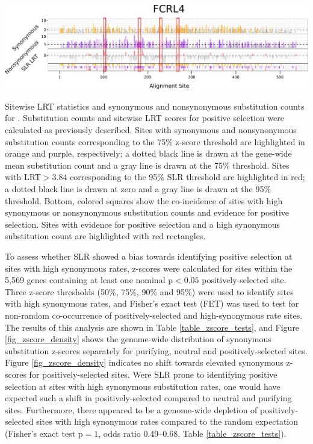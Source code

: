 \bbfig
\centering
\includegraphics[scale=0.7]{Figs/zscore_sites.pdf}
\caption{Sitewise LRT statistics and synonymous and nonsynonymous
  substitution counts for . Substitution counts and
  sitewise LRT scores for positive selection were calculated as
  previously described. Sites with synonymous and nonsynonymous
  substitution counts corresponding to the 75\% z-score threshold are
  highlighted in orange and purple, respectively; a dotted black line
  is drawn at the gene-wide mean substitution count and a gray line is
  drawn at the 75\% threshold. Sites with LRT$>3.84$ corresponding to
  the 95\% SLR threshold are highlighted in red; a dotted black line
  is drawn at zero and a gray line is drawn at the 95\%
  threshold. Bottom, colored squares show the co-incidence of sites
  with high synonymous or nonsynonymous substitution counts and
  evidence for positive selection. Sites with evidence for positive
  selection and a high synonymous substitution count are highlighted
  with red rectangles.}
\label{fig_zscore_sites}
\eefig


To assess whether SLR showed a bias towards identifying positive
selection at sites with high synonymous rates, z-scores were
calculated for sites within the 5,569 genes containing at least one
nominal p$<0.05$ positively-selected site. Three z-score thresholds
(50\%, 75\%, 90\% and 95\%) were used to identify sites with high
synonymous rates, and Fisher's exact test (FET) was used to test for
non-random co-occurrence of positively-selected and high-synonymous
rate sites. The results of this analysis are shown in Table
\ref{table_zscore_tests}, and Figure \ref{fig_zscore_density} shows the
genome-wide distribution of synonymous substitution z-scores
separately for purifying, neutral and positively-selected sites.
Figure \ref{fig_zscore_density} indicates no shift towards elevated
synonymous z-scores for positively-selected sites. Were SLR prone to
identifying positive selection at sites with high synonymous
substitution rates, one would have expected such a shift in
positively-selected compared to neutral and purifying
sites. Furthermore, there appeared to be a genome-wide depletion of
positively-selected sites with high synonymous rates compared to the
random expectation (Fisher's exact test p$=1$, odds ratio 0.49--0.68,
Table \ref{table_zscore_tests}).

